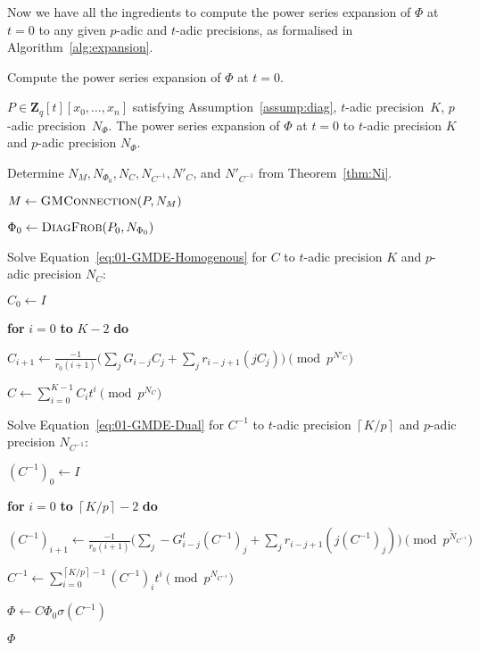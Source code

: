 \documentclass[a4paper,11pt]{article}
\numberwithin{equation}{section}
\providecommand{\ceil}[1]{\left\lceil#1\right\rceil}   %
\newcommand{\ZZ}{\mathbf{Z}} %
\theoremstyle{definition}
\begin{document}
Now we have all the ingredients to compute the power series expansion of 
$\Phi$ at $t=0$ to any given $p$-adic and $t$-adic precisions, as formalised 
in Algorithm~\ref{alg:expansion}.

\begin{algorithm}
\caption{Compute the power series expansion of $\Phi$ at $t=0$.}
\label{alg:expansion}
\begin{algorithmic}
\vspace{1mm}
\Require $P \in \ZZ_q[t][x_0,\dotsc,x_n]$ satisfying Assumption~\ref{assump:diag}, $t$-adic precision~$K$, $p$-adic precision~$N_{\Phi}$.
\Ensure  The power series expansion of $\Phi$ at $t=0$ to $t$-adic precision $K$ and $p$-adic precision $N_{\Phi}$.
\State \begin{compactenum}[{\hspace{6pt}} 1.] \vspace{-1.24em}
\item Determine $N_M,N_{\Phi_0},N_C,N_{C^{-1}},N'_C$, and $N'_{C^{-1}}$ from Theorem~\ref{thm:Ni}.
\item $M \gets \textsc{GMConnection}(P,N_M)$
\item $\Phi_0 \gets \textsc{DiagFrob}(P_0,N_{\Phi_0})$
\item Solve Equation~\eqref{eq:01-GMDE-Homogenous} for $C$ to $t$-adic precision $K$ and $p$-adic precision $N_{C}$:
\begin{compactenum}[a.] 
\item[] $C_0 \gets I$
\item[] \textbf{for} $i=0$ \textbf{to} $K-2$ \textbf{do} 
\item[] \hspace{0.6em} $C_{i+1} \gets \frac{-1}{r_0 (i+1)} \biggl(\sum_j G_{i-j} C_j + \sum_j r_{i-j+1} (j C_j) \biggr) \pmod{p^{N'_C}}$
\item[] $C \gets \sum_{i=0}^{K-1} C_i t^i \pmod{p^{N_C}}$
\end{compactenum}
\item Solve Equation~\eqref{eq:01-GMDE-Dual} for $C^{-1}$ to $t$-adic precision $\ceil{K/p}$ and $p$-adic precision $N_{C^{-1}}$:
\begin{compactenum}[a.]
\item[] $(C^{-1})_0 \gets I$
\item[] \textbf{for} $i=0$ \textbf{to} $\ceil{K/p}-2$ \textbf{do}
\item[] \hspace{0.6em} $(C^{-1})_{i+1} \gets  \frac{-1}{r_0(i+1)} \biggl(\sum_j -G_{i-j}^t (C^{-1})_j + \sum_j r_{i-j+1} (j (C^{-1})_j) \biggr) \pmod{p^{\tilde{N}_{C^{-1}}}}$
\item[] $C^{-1} \gets \sum_{i=0}^{\ceil{K/p}-1} (C^{-1})_i t^{i} \pmod{p^{N_{C^{-1}}}}$
\end{compactenum}
\item $\Phi \gets C \Phi_0 \sigma(C^{-1})$
\item \Return $\Phi$
\end{compactenum}
\EndProcedure
\end{algorithmic}
\end{algorithm}
\end{document}
